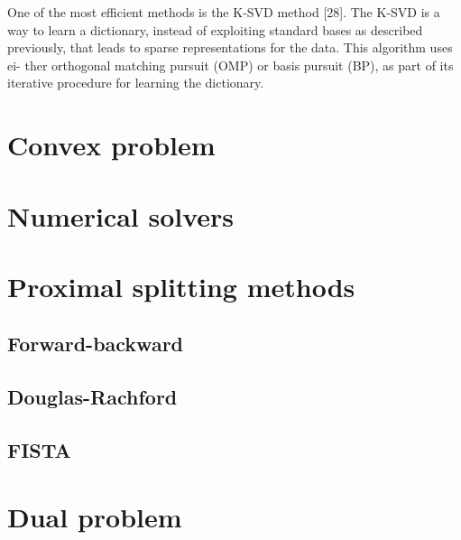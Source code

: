 One of the most efficient methods is the K-SVD method [28]. The K-SVD is a way to learn a dictionary, instead of exploiting standard bases as described previously, that leads to sparse representations for the data. This algorithm uses ei- ther orthogonal matching pursuit (OMP) or basis pursuit (BP), as part of its iterative procedure for learning the dictionary.

\section{Convex problem}

\section{Numerical solvers}

\section{Proximal splitting methods}

\subsection{Forward-backward}

\subsection{Douglas-Rachford}

\subsection{FISTA}

\section{Dual problem}

